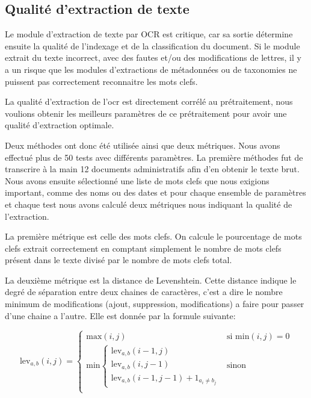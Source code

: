 \subsection{Qualité d'extraction de texte}\label{testOCR}
Le module d'extraction de texte par OCR est critique, car sa sortie détermine ensuite la qualité de l'indexage et de la classification du document. Si le module extrait du texte incorrect, avec des fautes et/ou des modifications de lettres, il y a un risque que les modules d'extractions de métadonnées ou de taxonomies ne puissent pas correctement reconnaitre les mots clefs. 

La qualité d'extraction de l'\gls{ocr} est directement corrélé au prétraitement, nous voulions obtenir les meilleurs paramètres de ce prétraitement pour avoir une qualité d'extraction optimale.

Deux méthodes ont donc été utilisée ainsi que deux métriques. Nous avons effectué plus de 50 tests avec différents paramètres. La première méthodes fut de transcrire à la main 12 documents administratifs afin d'en obtenir le texte brut. Nous avons ensuite sélectionné une liste de mots clefs que nous exigions important, comme des noms ou des dates et pour chaque ensemble de paramètres et chaque test nous avons calculé deux métriques nous indiquant la qualité de l'extraction.

La première métrique est celle des mots clefs. On calcule le pourcentage de mots clefs extrait correctement en comptant simplement le nombre de mots clefs présent dans le texte divisé par le nombre de mots clefs total. 

La deuxième métrique est la distance de Levenshtein. Cette distance indique le degré de séparation entre deux chaines de caractères, c'est a dire le nombre minimum de modifications (ajout, suppression, modifications) a faire pour passer d'une chaine a l'autre. Elle est donnée par la formule suivante:

\begin{equation}
	\text{lev}_{a,b}(i,j) = \left\{\begin{matrix}
		\text{max}(i,j) & \text{si min}(i,j) = 0 \\ 
		\text{min}\left\{\begin{matrix}
			\text{lev}_{a,b}(i-1,j)\\ 
			\text{lev}_{a,b}(i,j-1)\\ 
			\text{lev}_{a,b}(i-1,j-1)+1_{a_i \neq b_j}
		\end{matrix}\right. & \text{sinon} \\ 
	\end{matrix}\right.
\end{equation}

